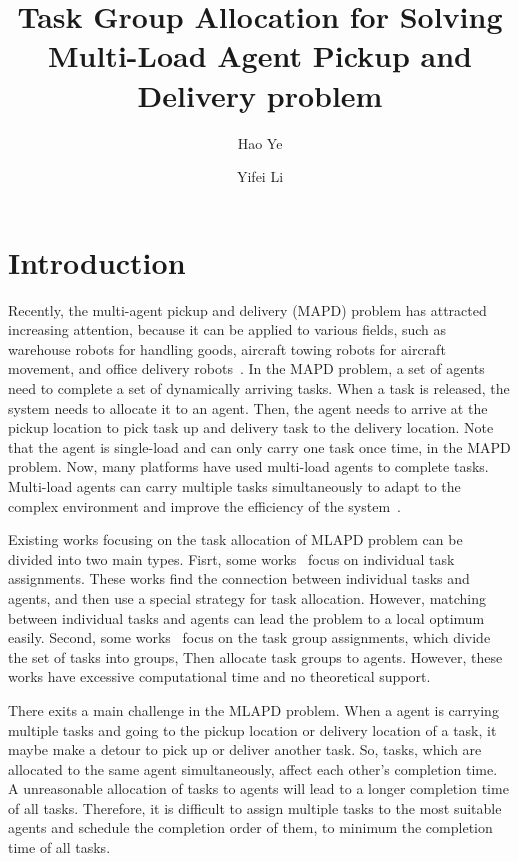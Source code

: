 \documentclass[sigconf,anonymous]{aamas}
\title[AAMAS-2025 Formatting Instructions]{Task Group Allocation for Solving Multi-Load Agent Pickup and Delivery problem}
\author{Hao Ye}
\affiliation{
  \institution{Harbin Institute of Technology (Shenzhen)}
  \city{Shenzhen}
  \country{China}}
\author{Yifei Li}
\affiliation{
  \institution{Harbin Institute of Technology (Shenzhen)}
  \city{Shenzhen}
  \country{China}}
\begin{document}

\pagestyle{fancy}
\fancyhead{}


\maketitle 

\section{Introduction}
\label{sec:introduction}
Recently, the multi-agent pickup and delivery (MAPD) problem has attracted increasing attention,
because it can be applied to various fields, 
such as warehouse robots for handling goods,
aircraft towing robots for aircraft movement,
and office delivery robots~\cite{li2021lifelong, ma2019lifelong, wurman2008coordinating}.
In the MAPD problem, a set of agents need to complete a set of dynamically arriving tasks.
When a task is released, the system needs to allocate it to an agent.
Then, the agent needs to arrive at the pickup location to pick task up 
and delivery task to the delivery location.
Note that the agent is single-load and can only carry one task once time, in the MAPD problem.
Now, many platforms have used multi-load agents to complete tasks.
Multi-load agents can carry multiple tasks simultaneously
to adapt to the complex environment and improve the efficiency of the system~\cite{shi2022adaptive, chen2021integrated}.

Existing works focusing on the task allocation of MLAPD problem can be divided into two main types.
Fisrt, some works~\cite{wu2021multi,zhang2022effective,wang2024task} focus on individual task assignments.
These works find the connection between individual tasks and agents,
and then use a special strategy for task allocation.
However, matching between individual tasks and agents can lead the problem to a local optimum easily.
Second, some works~\cite{bai2022group,electronics12183842} focus on the task group assignments,
which divide the set of tasks into groups,
Then allocate task groups to agents.
However, these works have excessive computational time and no theoretical support.

There exits a main challenge in the MLAPD problem.
When a agent is carrying multiple tasks
and going to the pickup location or delivery location of a task,
it maybe make a detour to pick up or deliver another task.
So, tasks,
which are allocated to the same agent simultaneously,
affect each other's completion time.
A unreasonable allocation of tasks to agents will 
lead to a longer completion time of all tasks.
Therefore, it is difficult to assign multiple tasks to the most suitable agents 
and schedule the completion order of them,
to minimum the completion time of all tasks.
\end{document}
